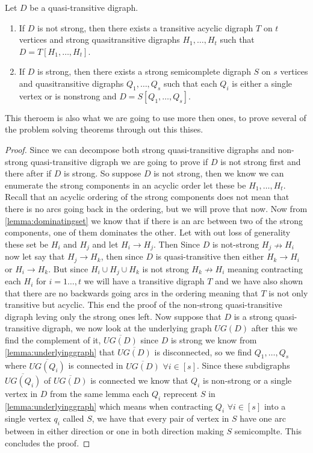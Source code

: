 \begin{thm}\cite{bangJGT85}
    Let $D$ be a quasi-transitive digraph.
    \begin{enumerate}
        \item If $D$ is not strong, then there exists a transitive acyclic digraph $T$ on $t$ vertices and strong quasitransitive digraphs $H_1,\dots,H_t$ such that $D=T[H_1,\dots,H_t]$.
        \item If $D$ is strong, then there exists a strong semicomplete digraph $S$ on $s$ vertices and quasitransitive digraphs $Q_1,\dots ,Q_s$ such that each $Q_i$ is either a single vertex or is nonstrong and $D=S[Q_1,\dots,Q_s]$.
    \end{enumerate}
    \label{thm:quasidecom}
\end{thm}
This theroem is also what we are going to use more then ones, to prove several of the problem solving theorems through out this thises.
\begin{proof}
    Since we can decompose both strong quasi-transitive digraphs and non-strong quasi-transitive digraph we are going to prove if $D$ is not strong first and there after if $D$ is strong.
    So suppose $D$ is not strong, then we know we can enumerate the strong components in an acyclic order let these be $H_1,\dots , H_t$. 
    Recall that an acyclic ordering of the strong components does not mean that there is no arcs going back in the ordering, but we will prove that now. 
    Now from \autoref{lemma:dominatingset} we know that if there is an arc between two of the strong components, one of them dominates the other.
    Let with out loss of generality these set be $H_i$ and $H_j$ and let $H_i\rightarrow H_j$. 
    Then Since $D$ is not-strong $H_j\nrightarrow H_i$ now let say that $H_j \rightarrow H_k$, then since $D$ is quasi-transitive then either $H_k\rightarrow H_i$ or $H_i \rightarrow H_k$. 
    But since $H_i\cup H_j \cup H_k$ is not strong $H_k\nrightarrow H_i$ meaning contracting each $H_i$ for $i=1\dots,t$ we will have a transitive digraph $T$ and we have also shown that there are no backwards going arcs in the ordering meaning that $T$ is not only transitive but acyclic. 
    This end the proof of the non-strong quasi-transitive digraph leving only the strong ones left.
    Now suppose that $D$ is a strong quasi-transitive digraph, we now look at the underlying graph $UG(D)$ after this we find the complement of it, $\overline{UG(D)}$ since $D$ is strong we know from \autoref{lemma:underlyinggraph} that $\overline{UG(D)}$ is disconnected, so we find $Q_1,\dots , Q_s$ where $\overline{UG(Q_i)}$ is connected in $\overline{UG(D)}$ $\forall i \in [s]$. Since these subdigraphs $\overline{UG(Q_i)}$ of $\overline{UG(D)}$ is connected we know that $Q_i$ is non-strong or a single vertex in $D$ from the same lemma each $Q_i$ reprecent $S$ in \autoref{lemma:underlyinggraph} which means when contracting $Q_i$ $\forall i\in [s]$ into a single vertex $q_i$ called $S$, we have that every pair of vertex in $S$ have one arc between in either direction or one in both direction making $S$ semicomplte. This concludes the proof.
\end{proof}
